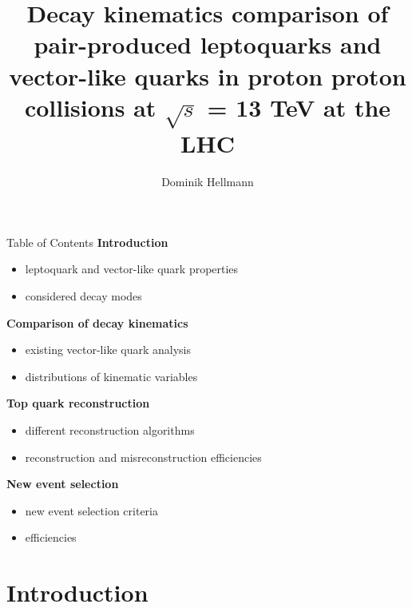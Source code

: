 \documentclass[aspectratio=1610, professionalfonts, 9pt]{beamer}
\title{Decay kinematics comparison of pair-produced leptoquarks and vector-like quarks
in proton proton collisions at \(\sqrt{s}\) = 13 TeV at the LHC}
\author[D.~Hellmann]{Dominik Hellmann}
\institute[E IV]{Experimentelle Physik 4 \\ Fakultät Physik}
\begin{document}
\maketitle
\begin{frame}{Table of Contents}
    \textbf{Introduction}
    \begin{itemize}
        \item leptoquark and vector-like quark properties
        \item considered decay modes
    \end{itemize}
    \textbf{Comparison of decay kinematics}
    \begin{itemize}
        \item existing vector-like quark analysis
        \item distributions of kinematic variables
    \end{itemize}
    \textbf{Top quark reconstruction}
    \begin{itemize}
        \item different reconstruction algorithms
        \item reconstruction and misreconstruction efficiencies
    \end{itemize}
    \textbf{New event selection}
    \begin{itemize}
        \item new event selection criteria
        \item efficiencies
    \end{itemize}
\end{frame}
\section{Introduction}
\end{document}
